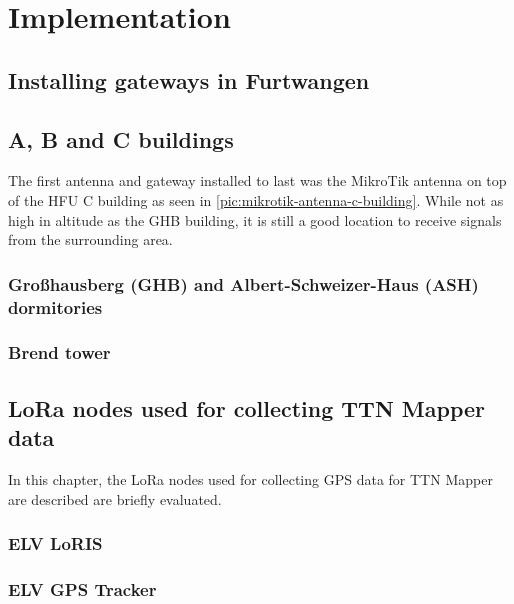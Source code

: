 \chapter{Implementation}

\section{Installing gateways in Furtwangen}

\section{A, B and C buildings}

The first antenna and gateway installed to last was the MikroTik antenna on top of the \ac{HFU} C building as seen in \cref{pic:mikrotik-antenna-c-building}.
While not as high in altitude as the GHB building, it is still a good location to receive signals from the surrounding area.

\subsection{Großhausberg (GHB) and Albert-Schweizer-Haus (ASH) dormitories}

\subsection{Brend tower}


\section{\ac{LoRa} nodes used for collecting TTN Mapper data}

In this chapter, the \ac{LoRa} nodes used for collecting GPS data for TTN Mapper are described are briefly evaluated.

\subsection{ELV LoRIS}


\subsection{ELV GPS Tracker}

